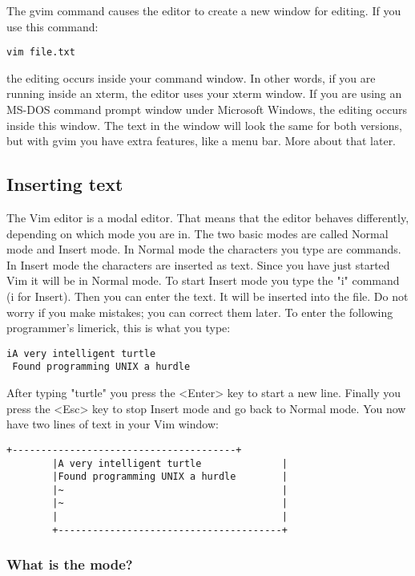 The gvim command causes the editor to create a new window for editing.
If you use this command:

 \begin{Verbatim}[samepage=true]
 vim file.txt
 \end{Verbatim}

the editing occurs inside your command window.
In other words, if you are running inside an xterm, the editor uses your xterm window.
If you are using an MS-DOS command prompt window under Microsoft Windows, the editing occurs inside this window.
The text in the window will look the same for both versions, but with gvim you have extra features, like a menu bar.
More about that later.

\subsection{Inserting text}
The Vim editor is a modal editor.
That means that the editor behaves differently, depending on which mode you are in.
The two basic modes are called Normal mode and Insert mode.
In Normal mode the characters you type are commands.
In Insert mode the characters are inserted as text.
Since you have just started Vim it will be in Normal mode.
To start Insert mode you type the "i" command (i for Insert).
Then you can enter the text.
It will be inserted into the file.
Do not worry if you make mistakes; you can correct them later.
To enter the following programmer's limerick, this is what you type:

 \begin{Verbatim}[samepage=true]
 iA very intelligent turtle
 Found programming UNIX a hurdle
 \end{Verbatim}

After typing "turtle" you press the <Enter> key to start a new line.
Finally you press the <Esc> key to stop Insert mode and go back to Normal mode.
You now have two lines of text in your Vim window: 

		\begin{Verbatim}[samepage=true]
		+---------------------------------------+
		|A very intelligent turtle              |
		|Found programming UNIX a hurdle        |
		|~                                      |
		|~                                      |
		|                                       |
		+---------------------------------------+
		\end{Verbatim}

\subsubsection{What is the mode?}

